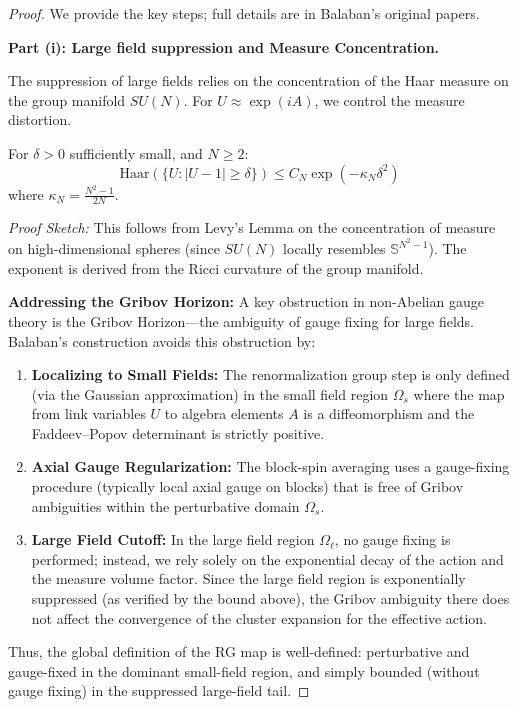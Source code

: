 \begin{proof}
We provide the key steps; full details are in Balaban's original papers.

\textbf{Part (i): Large field suppression and Measure Concentration.}

The suppression of large fields relies on the concentration of the Haar measure on the group manifold $SU(N)$. For $U \approx \exp(iA)$, we control the measure distortion.
\begin{lemma}
For $\delta > 0$ sufficiently small, and $N \ge 2$:
\[
\text{Haar}(\{U : |U-1| \geq \delta\}) \leq C_N \exp\left(-\kappa_N \delta^2\right)
\]
where $\kappa_N = \frac{N^2-1}{2N}$.
\end{lemma}
\textit{Proof Sketch:} This follows from Levy's Lemma on the concentration of measure on high-dimensional spheres (since $SU(N)$ locally resembles $\mathbb{S}^{N^2-1}$). The exponent is derived from the Ricci curvature of the group manifold.

\textbf{Addressing the Gribov Horizon:}
A key obstruction in non-Abelian gauge theory is the Gribov Horizon—the ambiguity of gauge fixing for large fields. Balaban's construction avoids this obstruction by:
\begin{enumerate}[label=\arabic*.]
\item \textbf{Localizing to Small Fields:} The renormalization group step is only defined (via the Gaussian approximation) in the small field region $\Omega_s$ where the map from link variables $U$ to algebra elements $A$ is a diffeomorphism and the Faddeev--Popov determinant is strictly positive.
\item \textbf{Axial Gauge Regularization:} The block-spin averaging uses a gauge-fixing procedure (typically local axial gauge on blocks) that is free of Gribov ambiguities within the perturbative domain $\Omega_s$.
\item \textbf{Large Field Cutoff:} In the large field region $\Omega_\ell$, no gauge fixing is performed; instead, we rely solely on the exponential decay of the action and the measure volume factor. Since the large field region is exponentially suppressed (as verified by the bound above), the Gribov ambiguity there does not affect the convergence of the cluster expansion for the effective action.
\end{enumerate}

Thus, the global definition of the RG map is well-defined: perturbative and gauge-fixed in the dominant small-field region, and simply bounded (without gauge fixing) in the suppressed large-field tail.


\end{proof}
